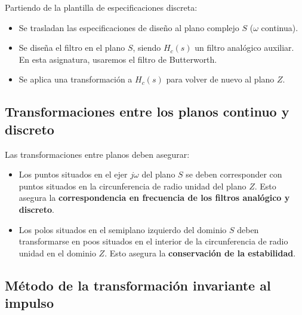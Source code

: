 \documentclass[a4paper,oneside]{book}
\begin{document}
Partiendo de la plantilla de especificaciones discreta:
\begin{itemize}
	\item Se trasladan las especificaciones de diseño al plano complejo $S$ ($\omega$ continua).
	\item Se diseña el filtro en el plano $S$, siendo $H_c(s)$ un filtro analógico auxiliar. En esta asignatura, usaremos el filtro de Butterworth.
	\item Se aplica una transformación a $H_c(s)$ para volver de nuevo al plano $Z$.
\end{itemize}

\subsection{Transformaciones entre los planos continuo y discreto}

Las transformaciones entre planos deben asegurar:
\begin{itemize}
	\item Los puntos situados en el ejer $j\omega$ del plano $S$ se deben corresponder con puntos situados en la circunferencia de radio unidad del plano $Z$. Esto asegura la \textbf{correspondencia en frecuencia de los filtros analógico y discreto}.
	\item Los polos situados en el semiplano izquierdo del dominio $S$ deben transformarse en poos situados en el interior de la circunferencia de radio unidad en el dominio $Z$. Esto asegura la \textbf{conservación de la estabilidad}.
\end{itemize}

\subsection{Método de la transformación invariante al impulso} \vspace*{\parskip}
\end{document}
